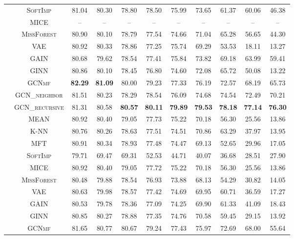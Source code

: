 \begin{table}[!pt]
{\begin{tabular}{c|c|ccccccccc}
& \textsc{SoftImp} & 81.04 & 80.30 & 78.80 & {78.50} & {75.99} & 73.65 & 61.37 & 60.06 & 46.38\\
& \textsc{MICE} & -- & -- & -- & -- & -- & -- & -- & -- & --\\
& \textsc{MissForest} & 80.90 & 80.10 & 78.79 & 77.54 & 74.66 & 71.04 & 65.28 & 56.65 & 44.30\\
& \textsc{VAE} & 80.92 & 80.33 & 78.86 & 77.25 & 75.74 & 69.29 & 53.53 & 18.11 & 13.27\\
& \textsc{GAIN} & 80.68 & 79.62 & 78.54 & 77.41 & 75.84 & {73.82} & {69.18} & {63.99} & {59.41}\\
& \textsc{GINN} & 80.86 & 80.10 & 78.45 & 76.80 & 74.60 & 72.08 & 65.72 & 50.08 & 13.22\\
& \textsc{GCNmf} & \textbf{82.29} & \textbf{81.09} & 80.00 & 79.23 & 77.33 & 76.19 & 72.57 & 68.19 & 65.73\\ 
&\textsc{GCN\_neighbor}  & 81.51 & 80.23 & 78.29 & 78.54 & 76.09 & 74.68 & 74.54 & 72.49 & 70.21 \\ 
&\textsc{GCN\_recursive}  & 81.31 & 80.58 & \textbf{80.57} & \textbf{80.11} & \textbf{79.89} & \textbf{79.53} & \textbf{78.18} & \textbf{77.14} & \textbf{76.30} \\ 
\midrule
{} & \textsc{MEAN} & {80.92} & {80.40} & {79.05} & {77.73} & {75.22} & 70.18 & 56.30 & 25.56 & 13.86\\
& \textsc{K-NN} & 80.76 & 80.26 & 78.63 & 77.51 & 74.51 & {70.86} & {63.29} & 37.97 & 13.95\\
& \textsc{MFT} & 80.91 & 80.34 & 78.93 & 77.48 & 74.47 & 69.13 & 52.65 & 29.96 & 17.05\\
& \textsc{SoftImp} & 79.71 & 69.47 & 69.31 & 52.53 & 44.71 & 40.07 & 36.68 & 28.51 & {27.90}\\
& \textsc{MICE} & {80.92} & {80.40} & {79.05} & 77.72 & {75.22} & 70.18 & 56.30 & 25.56 & 13.86\\
& \textsc{MissForest} & 80.48 & 79.88 & 78.54 & 76.93 & 73.88 & 68.13 & 54.29 & 30.82 & 14.05\\
& \textsc{VAE} & 80.63 & 79.98 & 78.57 & 77.42 & 74.69 & 69.95 & 60.71 & 36.59 & 17.27\\
& \textsc{GAIN} & 80.53 & 79.78 & 78.36 & 77.09 & 74.25 & 69.90 & 61.33 & {41.09} & 18.43\\
& \textsc{GINN} & 80.85 & 80.27 & 78.88 & 77.35 & 74.76 & 70.58 & 59.45 & 29.15 & 13.92\\
& \textsc{GCNmf} & 81.65 & 80.77 & 80.67 & 79.24 & 77.43 & 75.97 & 72.69 & 68.00 & 55.64\\ 

\end{tabular}}
\end{table}
